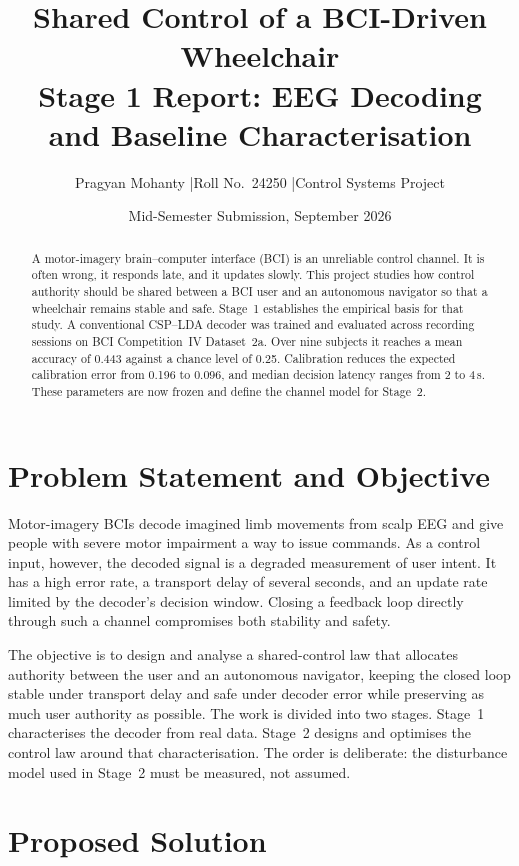 \documentclass[11pt,a4paper]{article}
\title{\vspace{-1.2cm}\textbf{Shared Control of a BCI-Driven Wheelchair}\\[3pt]
\large Stage 1 Report: EEG Decoding and Baseline Characterisation}
\author{Pragyan Mohanty \quad|\quad Roll No.\ 24250 \quad|\quad Control Systems Project}
\date{Mid-Semester Submission, September 2026}
\begin{document}
\maketitle
\vspace{-0.6cm}

\begin{abstract}
\noindent A motor-imagery brain--computer interface (BCI) is an unreliable control
channel. It is often wrong, it responds late, and it updates slowly. This project
studies how control authority should be shared between a BCI user and an
autonomous navigator so that a wheelchair remains stable and safe. Stage~1
establishes the empirical basis for that study. A conventional CSP--LDA decoder
was trained and evaluated across recording sessions on BCI Competition~IV
Dataset~2a. Over nine subjects it reaches a mean accuracy of 0.443 against a
chance level of 0.25. Calibration reduces the expected calibration error from
0.196 to 0.096, and median decision latency ranges from 2 to 4\,s. These
parameters are now frozen and define the channel model for Stage~2.
\end{abstract}

\section{Problem Statement and Objective}

Motor-imagery BCIs decode imagined limb movements from scalp EEG and give people
with severe motor impairment a way to issue commands. As a control input,
however, the decoded signal is a degraded measurement of user intent. It has a
high error rate, a transport delay of several seconds, and an update rate limited
by the decoder's decision window. Closing a feedback loop directly through such a
channel compromises both stability and safety.

The objective is to design and analyse a shared-control law that allocates
authority between the user and an autonomous navigator, keeping the closed loop
stable under transport delay and safe under decoder error while preserving as
much user authority as possible. The work is divided into two stages. Stage~1
characterises the decoder from real data. Stage~2 designs and optimises the
control law around that characterisation. The order is deliberate: the
disturbance model used in Stage~2 must be measured, not assumed.

\section{Proposed Solution}
\end{document}
